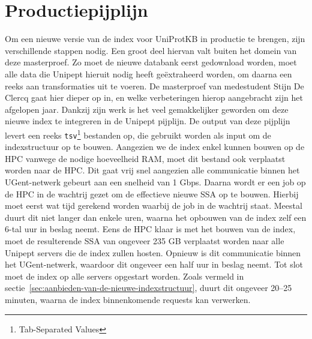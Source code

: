 \section{Productiepijplijn}
Om een nieuwe versie van de index voor UniProtKB in productie te brengen, zijn verschillende stappen nodig.
Een groot deel hiervan valt buiten het domein van deze masterproef.
Zo moet de nieuwe databank eerst gedownload worden, moet alle data die Unipept hieruit nodig heeft geëxtraheerd worden, om daarna een reeks aan transformaties uit te voeren.
De masterproef van medestudent Stijn De Clercq gaat hier dieper op in, en welke verbeteringen hierop aangebracht zijn het afgelopen jaar.
Dankzij zijn werk is het veel gemakkelijker geworden om deze nieuwe index te integreren in de Unipept pijplijn.
De output van deze pijplijn levert een reeks \texttt{tsv}\footnote{Tab-Separated Values} bestanden op, die gebruikt worden als input om de indexstructuur op te bouwen.
Aangezien we de index enkel kunnen bouwen op de HPC vanwege de nodige hoeveelheid RAM, moet dit bestand ook verplaatst worden naar de HPC\@.
Dit gaat vrij snel aangezien alle communicatie binnen het UGent-netwerk gebeurt aan een snelheid van 1 Gbps.
Daarna wordt er een job op de HPC in de wachtrij gezet om de effectieve nieuwe SSA op te bouwen.
Hierbij moet eerst wat tijd gerekend worden waarbij de job in de wachtrij staat.
Meestal duurt dit niet langer dan enkele uren, waarna het opbouwen van de index zelf een 6-tal uur in beslag neemt.
Eens de HPC klaar is met het bouwen van de index, moet de resulterende SSA van ongeveer 235 GB verplaatst worden naar alle Unipept servers die de index zullen hosten.
Opnieuw is dit communicatie binnen het UGent-netwerk, waardoor dit ongeveer een half uur in beslag neemt.
Tot slot moet de index op alle servers opgestart worden.
Zoals vermeld in sectie~\ref{sec:aanbieden-van-de-nieuwe-indexstructuur}, duurt dit ongeveer 20--25 minuten, waarna de index binnenkomende requests kan verwerken.
